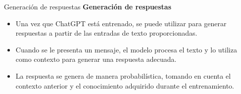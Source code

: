 \documentclass[11pt,aspectratio=169]{beamer}
\begin{document}
\begin{frame}{Generación de respuestas}
	\textbf{Generación de respuestas}
	\begin{itemize}
		\item Una vez que ChatGPT está entrenado, se puede utilizar para generar respuestas a partir de
			las entradas de texto proporcionadas.\pause 
		\item Cuando se le presenta un mensaje, el modelo procesa el texto y lo utiliza como contexto 
			para generar una respuesta adecuada. \pause 
		\item La respuesta se genera de manera probabilística, tomando en cuenta el contexto anterior 
			y el conocimiento adquirido durante el entrenamiento.
	\end{itemize}
\end{frame}	
\end{document}
